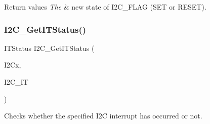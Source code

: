 \begin{DoxyRetVals}{Return values}
{\em The} & new state of I2\+C\+\_\+\+F\+L\+AG (S\+ET or R\+E\+S\+ET). \\
\hline
\end{DoxyRetVals}
\mbox{\label{group___i2_c_ga447771fbbd94a56f3570b9f430a069ba}} 
\subsubsection{\texorpdfstring{I2\+C\+\_\+\+Get\+I\+T\+Status()}{I2C\_GetITStatus()}}
{\footnotesize\ttfamily I\+T\+Status I2\+C\+\_\+\+Get\+I\+T\+Status (\begin{DoxyParamCaption}\item[{I2\+C\+\_\+\+Type\+Def $\ast$}]{I2\+Cx,  }\item[{uint32\+\_\+t}]{I2\+C\+\_\+\+IT }\end{DoxyParamCaption})}



Checks whether the specified I2C interrupt has occurred or not. 


